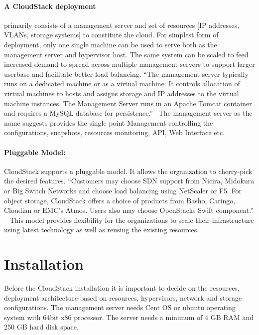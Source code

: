 \paragraph {A CloudStack deployment} primarily consists of a management server and
set of resources [IP addresses, VLANs, storage systems] to constitute
the cloud.  For simplest form of deployment, only one single machine
can be used to serve both as the management server and hypervisor
host. The same system can be scaled to feed increased demand to spread
across multiple management servers to support larger userbase and
facilitate better load balancing. ``The management server typically runs
on a dedicated machine or as a virtual machine. It controls allocation
of virtual machines to hosts and assigns storage and IP addresses to
the virtual machine instances. The Management Server runs in an Apache
Tomcat container and requires a MySQL database for
persistence.''~\cite{hid-sp18-417-www-cloudstack-management-server} 
The management server as the name suggests provides the single point 
Management controlling the configurations, snapshots, resources monitoring, 
API, Web Interface etc. 

\paragraph {Pluggable Model:} CloudStack supports a pluggable model. It 
allows the organization to cherry-pick the desired features. ``Customers may 
choose SDN support from Nicira, Midokura or Big Switch Networks and choose load
balancing using NetScaler or F5. For object storage, CloudStack offers a choice of
products from Basho, Caringo, Cloudian or EMC's Atmos. Users also may choose
OpenStacks Swift component.'' ~\cite{hid-sp18-417-www-cloudstack-model}
This model provides flexibility for the organizations to scale their infrastructure 
using latest technology as well as reusing the existing resources.

\section{Installation}

Before the CloudStack installation it is important to decide on the resources,
deployment architecture-based on resources, hypervisors, network and storage 
configurations. The management server needs Cent OS or ubuntu operating system
with 64bit x86 processor. The server needs a minimum of 4 GB RAM and 250 GB
hard disk space. 

